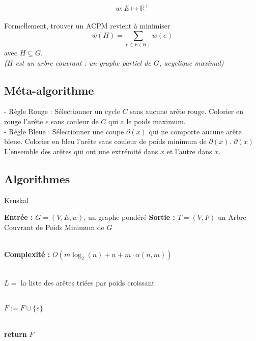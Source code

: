 \documentclass{article}      %
\begin{document}
$$w : E \mapsto \mathbb{R}^+$$
%
\\
Formellement, trouver un ACPM revient à minimiser 
$$w(H) = \sum_{e \in E(H)} w(e)$$ 
avec $H \subseteq G$.
\\ \textit{($H$ est un arbre couvrant : un graphe partiel de $G$, acyclique maximal)}

\subsection{Méta-algorithme}

- Règle Rouge : Sélectionner un cycle $C$ sans aucune arête rouge.
Colorier en rouge l’arête $e$ sans couleur de $C$ qui a le poids maximum.
\\- Règle Bleue : Sélectionner une coupe $\partial(x)$ qui ne comporte aucune arête bleue.
Colorier en bleu l’arête sans couleur de poids minimum de $\partial(x)$. 
%
$\partial(x)$ L’ensemble des arêtes qui ont une extrémité dans $x$ et l’autre dans $\overline{x}$. 


\subsection{Algorithmes}
\begin{algorithm}[H] \caption{Kruskal}
\begin{algorithmic}

\State \textbf{Entrée :} $G = (V, E, w)$, un graphe pondéré
\State \textbf{Sortie :} $T = (V, F)$ un Arbre Couvrant de Poids Minimum de $G$

\\ \State \textbf{Complexité :} $O(m\log_2(n) + n + m \cdot \alpha(n,m))$

\\ \State $L =$ la liste des arêtes triées par poids croissant

\\
        \State $F := F \cup \{e\}$
    \EndIf
\EndFor

\\ \State \textbf{return} $F$
\end{algorithmic}
\end{algorithm}
\end{document}
